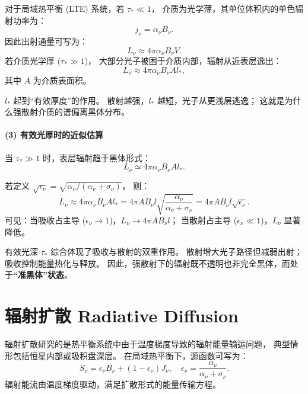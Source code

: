 
对于局域热平衡 (LTE) 系统，若 $\tau_* \ll 1$，
介质为光学薄，其单位体积内的单色辐射功率为：
\[
j_\nu = \alpha_\nu B_\nu.
\]
因此出射通量可写为：
\[
L_\nu \approx 4\pi \alpha_\nu B_\nu V.
\]
若介质光学厚 ($\tau_* \gg 1$)，
大部分光子被困于介质内部，辐射从近表层逸出：
\[
L_\nu \approx 4\pi \alpha_\nu B_\nu A l_*,
\]
其中 $A$ 为介质表面积。

\begin{derivationnote}[]
$l_*$ 起到“有效厚度”的作用。
散射越强，$l_*$ 越短，光子从更浅层逃逸；
这就是为什么强散射介质的谱偏离黑体分布。
\end{derivationnote}

\paragraph{(3) 有效光厚时的近似估算}


当 $\tau_* \gg 1$ 时，表层辐射趋于黑体形式：
\[
L_\nu \simeq 4\pi \alpha_\nu B_\nu A l_*.
\]

若定义 $\sqrt{\epsilon_\nu} = \sqrt{\alpha_\nu / (\alpha_\nu+\sigma_\nu)}$，
则：
\[
L_\nu \approx 4\pi \alpha_\nu B_\nu A l_* 
     = 4\pi A B_\nu l \sqrt{\frac{\alpha_\nu}{\alpha_\nu+\sigma_\nu}}
     = 4\pi A B_\nu l \sqrt{\epsilon_\nu}.
\]
可见：当吸收占主导 ($\epsilon_\nu\!\to\!1$)，$L_\nu\!\to\!4\pi A B_\nu l$；
当散射占主导 ($\epsilon_\nu\!\ll\!1$)，$L_\nu$ 显著降低。

\begin{derivationnote}[]
有效光深 $\tau_*$ 综合体现了吸收与散射的双重作用。  
散射增大光子路径但减弱出射；
吸收控制能量热化与释放。  
因此，强散射下的辐射既不透明也非完全黑体，而处于\textbf{“准黑体”状态}。
\end{derivationnote}
\section{辐射扩散 Radiative Diffusion}


辐射扩散研究的是热平衡系统中由于温度梯度导致的辐射能量输运问题，
典型情形包括恒星内部或吸积盘深层。
在局域热平衡下，源函数可写为：
\[
S_\nu = \epsilon_\nu B_\nu + (1 - \epsilon_\nu) J_\nu, 
\quad \epsilon_\nu = \frac{\alpha_\nu}{\alpha_\nu + \sigma_\nu}.
\]
辐射能流由温度梯度驱动，满足扩散形式的能量传输方程。

